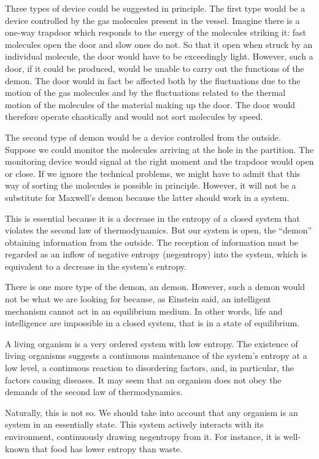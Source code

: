 Three types of device could be suggested in principle. The first type would be a device controlled by the gas molecules present in the vessel. Imagine there is a one-way trapdoor which responds to the energy of the molecules striking it: fast molecules open the door and slow ones do not. So that it open when struck by an individual molecule, the door would have to be exceedingly light. However, such a door, if it could be produced, would be unable to carry out the functions of the demon. The door would in fact be affected both by the fluctuations due to the motion of the gas molecules and by the fluctuations related to the thermal motion of the molecules of the material making up the door. The door would therefore operate chaotically and would not sort molecules by speed.

The second type of demon would be a device controlled from the outside. Suppose we could monitor the molecules arriving at the hole in the partition. The monitoring device would signal at the right moment and the trapdoor would open or close. If we ignore the technical problems, we might have to admit that this way of sorting the molecules is possible in principle. However, it will not be a substitute for Maxwell's demon because the latter should work in a  system.

This is essential because it is a decrease in the entropy of a closed system that violates the second law of thermodynamics. But our system is open, the ``demon'' obtaining information from the outside. The reception of information must be regarded as an inflow of negative entropy (negentropy) into the system, which is equivalent to a decrease in the system's entropy.

There is one more type of the demon, an  demon. However, such a demon would not be what we are looking for because, as Einstein said, an intelligent mechanism cannot act in an equilibrium medium. In other words, life and intelligence are impossible in a closed system, that is in a state of equilibrium.

 A living organism is a very ordered system with low entropy. The existence of living organisms suggests a continuous maintenance of the system's entropy at a low level, a continuous reaction to disordering factors, and, in particular, the factors causing diseases. It may seem that an organism does not obey the demands of the second law of thermodynamics.

Naturally, this is not so. We should take into account that any organism is an  system in an essentially  state. This system actively interacts with its environment, continuously drawing negentropy from it. For instance, it is well-known that food has lower entropy than waste.

